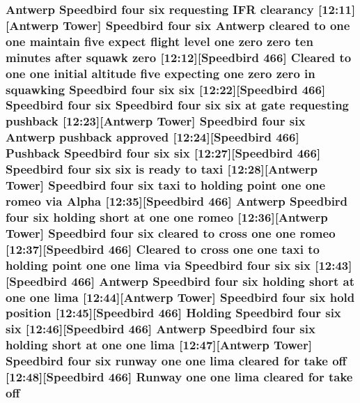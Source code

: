 \subsubsection[{\texorpdfstring{off}{off}}]{\setlength{\rightskip}{0pt plus 5cm}Antwerp Speedbird four {\bf six} requesting I\+FR clearancy \mbox{[}12\+:11\mbox{]}\mbox{[}Antwerp {\bf Tower}\mbox{]} Speedbird four {\bf six} Antwerp cleared to {\bf one} {\bf one} maintain five expect flight level {\bf one} {\bf zero} {\bf zero} {\bf ten} minutes after squawk {\bf zero} \mbox{[}12\+:12\mbox{]}\mbox{[}Speedbird 466\mbox{]} Cleared to {\bf one} {\bf one} initial altitude five expecting {\bf one} {\bf zero} {\bf zero} in {\bf squawking} Speedbird four {\bf six} {\bf six} \mbox{[}12\+:22\mbox{]}\mbox{[}Speedbird 466\mbox{]} Speedbird four {\bf six} Speedbird four {\bf six} {\bf six} at gate requesting pushback \mbox{[}12\+:23\mbox{]}\mbox{[}Antwerp {\bf Tower}\mbox{]} Speedbird four {\bf six} Antwerp pushback {\bf approved} \mbox{[}12\+:24\mbox{]}\mbox{[}Speedbird 466\mbox{]} Pushback Speedbird four {\bf six} {\bf six} \mbox{[}12\+:27\mbox{]}\mbox{[}Speedbird 466\mbox{]} Speedbird four {\bf six} {\bf six} is ready to taxi \mbox{[}12\+:28\mbox{]}\mbox{[}Antwerp {\bf Tower}\mbox{]} Speedbird four {\bf six} taxi to holding point {\bf one} {\bf one} {\bf romeo} via {\bf Alpha} \mbox{[}12\+:35\mbox{]}\mbox{[}Speedbird 466\mbox{]} Antwerp Speedbird four {\bf six} holding short at {\bf one} {\bf one} {\bf romeo} \mbox{[}12\+:36\mbox{]}\mbox{[}Antwerp {\bf Tower}\mbox{]} Speedbird four {\bf six} cleared to cross {\bf one} {\bf one} {\bf romeo} \mbox{[}12\+:37\mbox{]}\mbox{[}Speedbird 466\mbox{]} Cleared to cross {\bf one} {\bf one} taxi to holding point {\bf one} {\bf one} {\bf lima} via Speedbird four {\bf six} {\bf six} \mbox{[}12\+:43\mbox{]}\mbox{[}Speedbird 466\mbox{]} Antwerp Speedbird four {\bf six} holding short at {\bf one} {\bf one} {\bf lima} \mbox{[}12\+:44\mbox{]}\mbox{[}Antwerp {\bf Tower}\mbox{]} Speedbird four {\bf six} hold {\bf position} \mbox{[}12\+:45\mbox{]}\mbox{[}Speedbird 466\mbox{]} Holding Speedbird four {\bf six} {\bf six} \mbox{[}12\+:46\mbox{]}\mbox{[}Speedbird 466\mbox{]} Antwerp Speedbird four {\bf six} holding short at {\bf one} {\bf one} {\bf lima} \mbox{[}12\+:47\mbox{]}\mbox{[}Antwerp {\bf Tower}\mbox{]} Speedbird four {\bf six} runway {\bf one} {\bf one} {\bf lima} cleared for take off \mbox{[}12\+:48\mbox{]}\mbox{[}Speedbird 466\mbox{]} {\bf Runway} {\bf one} {\bf one} {\bf lima} cleared for take off}\hypertarget{happyDay4ATC_8txt_a29c691e3d615c36339c8fd5f44a0cff1}{}\label{happyDay4ATC_8txt_a29c691e3d615c36339c8fd5f44a0cff1}
